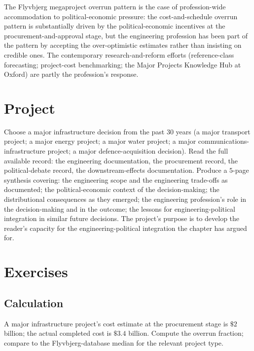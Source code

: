 The Flyvbjerg megaproject overrun pattern \cite{paper:flyvbjerg-megaprojects-2014} is the case of profession-wide accommodation to political-economic pressure: the cost-and-schedule overrun pattern is substantially driven by the political-economic incentives at the procurement-and-approval stage, but the engineering profession has been part of the pattern by accepting the over-optimistic estimates rather than insisting on credible ones. The contemporary research-and-reform efforts (reference-class forecasting; project-cost benchmarking; the Major Projects Knowledge Hub at Oxford) are partly the profession's response.

\section{Project}

\begin{project}
Choose a major infrastructure decision from the past $30$ years (a major transport project; a major energy project; a major water project; a major communications-infrastructure project; a major defence-acquisition decision). Read the full available record: the engineering documentation, the procurement record, the political-debate record, the downstream-effects documentation. Produce a $5$-page synthesis covering: the engineering scope and the engineering trade-offs as documented; the political-economic context of the decision-making; the distributional consequences as they emerged; the engineering profession's role in the decision-making and in the outcome; the lessons for engineering-political integration in similar future decisions. The project's purpose is to develop the reader's capacity for the engineering-political integration the chapter has argued for.
\end{project}

\section{Exercises}

\subsection*{Calculation}

\begin{exercise}
A major infrastructure project's cost estimate at the procurement stage is $\$2$ billion; the actual completed cost is $\$3.4$ billion. Compute the overrun fraction; compare to the Flyvbjerg-database median for the relevant project type.
\end{exercise}


